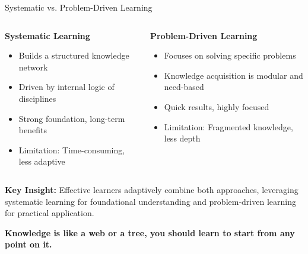 \begin{frame}[fragile]{ Systematic vs. Problem-Driven Learning}
	\scriptsize
	\begin{columns}
		\begin{column}{0.4\textwidth}
			\textbf{Systematic Learning}
			\begin{itemize}
				\item Builds a structured knowledge network
				\item Driven by internal logic of disciplines
				\item Strong foundation, long-term benefits
				\item Limitation: Time-consuming, less adaptive
			\end{itemize}
		\end{column}
		\begin{column}{0.6\textwidth}
			\textbf{Problem-Driven Learning}
			\begin{itemize}
				\item Focuses on solving specific problems
				\item Knowledge acquisition is modular and need-based
				\item Quick results, highly focused
				\item Limitation: Fragmented knowledge, less depth
			\end{itemize}
		\end{column}
	\end{columns}
	\vspace{0.5cm}
	\textbf{Key Insight:} Effective learners adaptively combine both approaches, leveraging systematic learning for foundational understanding and problem-driven learning for practical application.


	\textbf{Knowledge is like a web or a tree, you should learn to start from any point on it.}

\end{frame}


